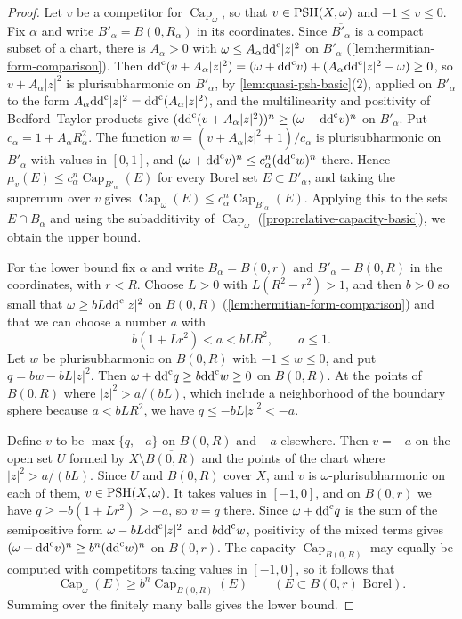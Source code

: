 \begin{proof}
Let $v$ be a competitor for $\operatorname{Cap}_\omega$, so that $v\in\mathrm{PSH}(X,\omega)$ and $-1\leq v\leq0$. Fix $\alpha$ and write $B'_\alpha=B(0,R_\alpha)$ in its coordinates. Since $\overline{B'_\alpha}$ is a compact subset of a chart, there is $A_\alpha>0$ with $\omega\leq A_\alpha\mathrm{dd}^{\mathrm{c}}|z|^2$ on $B'_\alpha$ (\cref{lem:hermitian-form-comparison}). Then $\mathrm{dd}^{\mathrm{c}}(v+A_\alpha|z|^2)=(\omega+\mathrm{dd}^{\mathrm{c}} v)+(A_\alpha\mathrm{dd}^{\mathrm{c}}|z|^2-\omega)\geq0$, so $v+A_\alpha|z|^2$ is plurisubharmonic on $B'_\alpha$, by \cref{lem:quasi-psh-basic}(2), applied on $B'_\alpha$ to the form $A_\alpha\mathrm{dd}^{\mathrm{c}}|z|^2=\mathrm{dd}^{\mathrm{c}}(A_\alpha|z|^2)$, and the multilinearity and positivity of Bedford--Taylor products give $(\mathrm{dd}^{\mathrm{c}}(v+A_\alpha|z|^2))^n\geq(\omega+\mathrm{dd}^{\mathrm{c}} v)^n$ on $B'_\alpha$. Put $c_\alpha=1+A_\alpha R_\alpha^2$. The function $w=(v+A_\alpha|z|^2+1)/c_\alpha$ is plurisubharmonic on $B'_\alpha$ with values in $[0,1]$, and $(\omega+\mathrm{dd}^{\mathrm{c}} v)^n\leq c_\alpha^n(\mathrm{dd}^{\mathrm{c}} w)^n$ there. Hence $\mu_v(E)\leq c_\alpha^n\operatorname{Cap}_{B'_\alpha}(E)$ for every Borel set $E\subset B'_\alpha$, and taking the supremum over $v$ gives $\operatorname{Cap}_\omega(E)\leq c_\alpha^n\operatorname{Cap}_{B'_\alpha}(E)$. Applying this to the sets $E\cap B_\alpha$ and using the subadditivity of $\operatorname{Cap}_\omega$ (\cref{prop:relative-capacity-basic}), we obtain the upper bound.

For the lower bound fix $\alpha$ and write $B_\alpha=B(0,r)$ and $B'_\alpha=B(0,R)$ in the coordinates, with $r<R$. Choose $L>0$ with $L(R^2-r^2)>1$, and then $b>0$ so small that $\omega\geq bL\mathrm{dd}^{\mathrm{c}}|z|^2$ on $B(0,R)$ (\cref{lem:hermitian-form-comparison}) and that we can choose a number $a$ with
\[
 b(1+Lr^2)<a<bLR^2,\qquad a\leq1.
\]
Let $w$ be plurisubharmonic on $B(0,R)$ with $-1\leq w\leq0$, and put $q=bw-bL|z|^2$. Then $\omega+\mathrm{dd}^{\mathrm{c}} q\geq b\mathrm{dd}^{\mathrm{c}} w\geq0$ on $B(0,R)$. At the points of $B(0,R)$ where $|z|^2>a/(bL)$, which include a neighborhood of the boundary sphere because $a<bLR^2$, we have $q\leq-bL|z|^2<-a$.

Define $v$ to be $\max\{q,-a\}$ on $B(0,R)$ and $-a$ elsewhere. Then $v=-a$ on the open set $U$ formed by $X\setminus\overline{B(0,R)}$ and the points of the chart where $|z|^2>a/(bL)$. Since $U$ and $B(0,R)$ cover $X$, and $v$ is $\omega$-plurisubharmonic on each of them, $v\in\mathrm{PSH}(X,\omega)$. It takes values in $[-1,0]$, and on $B(0,r)$ we have $q\geq-b(1+Lr^2)>-a$, so $v=q$ there. Since $\omega+\mathrm{dd}^{\mathrm{c}} q$ is the sum of the semipositive form $\omega-bL\mathrm{dd}^{\mathrm{c}}|z|^2$ and $b\mathrm{dd}^{\mathrm{c}} w$, positivity of the mixed terms gives $(\omega+\mathrm{dd}^{\mathrm{c}} v)^n\geq b^n(\mathrm{dd}^{\mathrm{c}} w)^n$ on $B(0,r)$. The capacity $\operatorname{Cap}_{B(0,R)}$ may equally be computed with competitors taking values in $[-1,0]$, so it follows that
\[
 \operatorname{Cap}_\omega(E)\geq b^n
                 \operatorname{Cap}_{B(0,R)}(E)
                   \qquad(E\subset B(0,r)\text{ Borel}).
\]
Summing over the finitely many balls gives the lower bound.


\end{proof}

